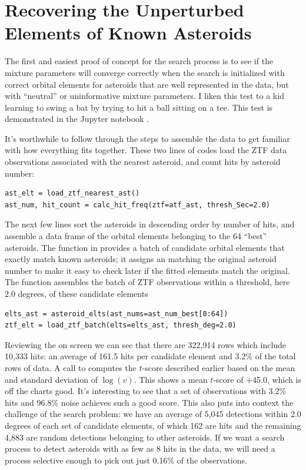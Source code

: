 \section{Recovering the Unperturbed Elements of Known Asteroids}
\label{section_results_known_ast_unperturbed}

The first and easiest proof of concept for the search process is to see if the mixture parameters will converge correctly
when the search is initialized with correct orbital elements for asteroids that are well represented in the data,
but with ``neutral'' or uninformative mixture parameters.
I liken this test to a kid learning to swing a bat by trying to hit a ball sitting on a tee.
This test is demonstrated in the Jupyter notebook .

It's worthwhile to follow through the steps to assemble the data to get familiar with how everything fits together.
These two lines of codes load the ZTF data observations associated with the nearest asteroid, and count hits by asteroid number:
\begin{lstlisting}[style=CodeSnippet]
ast_elt = load_ztf_nearest_ast()
ast_num, hit_count = calc_hit_freq(ztf=atf_ast, thresh_Sec=2.0)
\end{lstlisting}
The next few lines sort the asteroids in descending order by number of hits, 
and assemble a data frame of the orbital elements belonging to the 64 ``best'' asteroids.
The function  in  provides a batch of candidate orbital elements
that exactly match known asteroids; it assigns an  matching the original asteroid number to make it easy
to check later if the fitted elements match the original.
The function  assembles the batch of ZTF observations within a threshold, 
here 2.0 degrees, of these candidate elements
\begin{lstlisting}[style=CodeSnippet]
elts_ast = asteroid_elts(ast_nums=ast_num_best[0:64])
ztf_elt = load_ztf_batch(elts=elts_ast, thresh_deg=2.0)
\end{lstlisting}

Reviewing the  on screen we can see that there are 322,914 rows which include 10,333 hits:
an average of 161.5 hits per candidate element and 3.2\% of the total rows of data.
A call to  computes the $t$-score described earlier based on the mean and standard deviation of $\log(v)$.
This shows a mean $t$-score of +45.0, which is off the charts good.
It's interesting to see that a set of observations with 3.2\% hits and 96.8\% noise achieves such a good score.
This also puts into context the challenge of the search problem: 
we have an average of 5,045 detections within 2.0 degrees of each set of candidate elements,
of which 162 are hits and the remaining 4,883 are random detections belonging to other asteroids.
If we want a search process to detect asteroids with as few as 8 hits in the data, 
we will need a process selective enough to pick out just 0.16\% of the observations.

